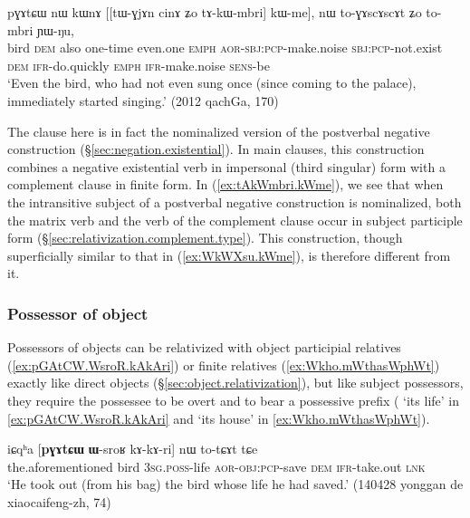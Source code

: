 \begin{exe}
\ex \label{ex:tAkWmbri.kWme}
 \gll  pɣɤtɕɯ nɯ kɯnɤ [[tɯ-ɣjɤn cinɤ ʑo tɤ-kɯ-mbri] kɯ-me], nɯ to-ɣɤscɤscɤt ʑo to-mbri ɲɯ-ŋu, \\
bird \textsc{dem} also one-time even.one \textsc{emph} \textsc{aor}-\textsc{sbj}:\textsc{pcp}-make.noise \textsc{sbj}:\textsc{pcp}-not.exist \textsc{dem} \textsc{ifr}-do.quickly \textsc{emph} \textsc{ifr}-make.noise \textsc{sens}-be \\
\glt `Even the bird, who had not even sung once (since coming to the palace), immediately started singing.' (2012 qachGa, 170)
 \end{exe}

The clause  here is in fact the nominalized version of the postverbal negative construction  (§\ref{sec:negation.existential}). In main clauses, this construction combines a negative existential verb in impersonal (third singular) form with a complement clause in finite form. In (\ref{ex:tAkWmbri.kWme}), we see that when the intransitive subject of a postverbal negative construction is nominalized, both the matrix verb  and the verb of the complement clause  occur in subject participle form (§\ref{sec:relativization.complement.type}). This construction, though superficially similar to that in (\ref{ex:WkWXsu.kWme}), is therefore different from it.


\subsubsection{Possessor of object}  \label{sec:O.possessor.relativization}
Possessors of objects can be relativized with object participial relatives (\ref{ex:pGAtCW.WsroR.kAkAri}) or finite relatives (\ref{ex:Wkho.mWthasWphWt}) exactly like direct objects (§\ref{sec:object.relativization}), but like subject possessors, they require the possessee to be overt and to bear a possessive prefix ( `its life' in \ref{ex:pGAtCW.WsroR.kAkAri} and  `its house' in \ref{ex:Wkho.mWthasWphWt}).

\begin{exe}
\ex \label{ex:pGAtCW.WsroR.kAkAri}
\gll iɕqʰa [\textbf{pɣɤtɕɯ} \textbf{ɯ}-sroʁ kɤ-kɤ-ri] nɯ to-tɕɤt tɕe \\
the.aforementioned bird  \textsc{3sg}.\textsc{poss}-life \textsc{aor}-\textsc{obj}:\textsc{pcp}-save \textsc{dem} \textsc{ifr}-take.out \textsc{lnk} \\
\glt `He took out (from his bag) the bird whose life he had saved.' (140428 yonggan de xiaocaifeng-zh, 74)
\end{exe}

